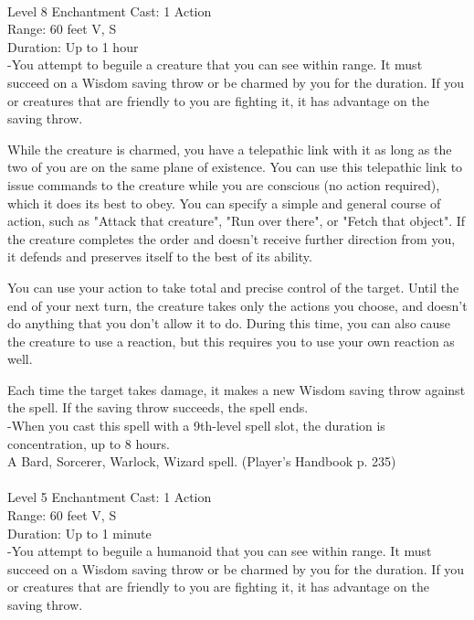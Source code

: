 \documentclass[10pt,twocolumn]{report}
\begin{document}
 \\
Level 8 \quad Enchantment \quad Cast: 1 Action\\
Range: 60 feet \quad V, S\\
Duration: Up to 1 hour \quad \\
-You attempt to beguile a creature that you can see within range. 
It must succeed on a Wisdom saving throw or be charmed by you for the duration. If you or creatures that are friendly to you are fighting it, it has advantage on the saving throw. 

While the creature is charmed, you have a telepathic link with it as long as the two of you are on the same plane of existence. You can use this telepathic link to issue commands to the creature while you are conscious (no action required), which it does its best to obey. You can specify a simple and general course of action, such as "Attack that creature", "Run over there", or "Fetch that object". If the creature completes the order and doesn’t receive further direction from you, it defends and preserves itself to the best of its ability. 

You can use your action to take total and precise control of the target. Until the end of your next turn, the creature takes only the actions you choose, and doesn’t do anything that you don’t allow it to do. During this time, you can also cause the creature to use a reaction, but this requires you to use your own reaction as well. 

Each time the target takes damage, it makes a new Wisdom saving throw against the spell. If the saving throw succeeds, the spell ends.\\
-When you cast this spell with a 9th-level spell slot, the duration is concentration, up to 8 hours.\\
A Bard, Sorcerer, Warlock, Wizard spell. (Player's Handbook p. 235) \\


 \\
Level 5 \quad Enchantment \quad Cast: 1 Action\\
Range: 60 feet \quad V, S\\
Duration: Up to 1 minute \quad \\
-You attempt to beguile a humanoid that you can see within range. 
It must succeed on a Wisdom saving throw or be charmed by you for the duration. If you or creatures that are friendly to you are fighting it, it has advantage on the saving throw. 
\end{document}
